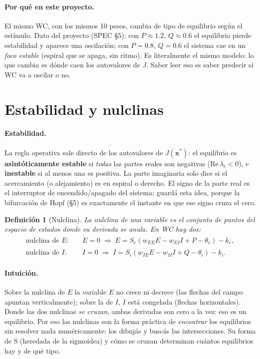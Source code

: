 \documentclass[11pt,a4paper]{article}
\newtheorem{definition}{Definición}
\begin{document}
\paragraph{Por qué en este proyecto.} El mismo WC, con los mismos 10 pesos, cambia de tipo de equilibrio según el estímulo. Dato del proyecto (SPEC \S5): con $P\!\approx\!1.2,\,Q\!\approx\!0.6$ el equilibrio pierde estabilidad y aparece una oscilación; con $P\!=\!0.8,\,Q\!=\!0.6$ el sistema cae en un \emph{foco estable} (espiral que se apaga, sin ritmo). Es literalmente el mismo modelo: lo que cambia es dónde caen los autovalores de $J$. Saber leer eso es saber predecir si WC va a oscilar o no.

\section{Estabilidad y nulclinas}

\paragraph{Estabilidad.} La regla operativa sale directo de los autovalores de $J(\mathbf{x}^{*})$: el equilibrio es \textbf{asintóticamente estable} si \emph{todas} las partes reales son negativas ($\mathrm{Re}\,\lambda_i<0$), e \textbf{inestable} si al menos una es positiva. La parte imaginaria solo dice si el acercamiento (o alejamiento) es en espiral o derecho. El signo de la parte real es el interruptor de encendido/apagado del sistema; guardá esta idea, porque la bifurcación de Hopf (\S5) es exactamente el instante en que ese signo cruza el cero.

\begin{definition}[Nulclina]
La \emph{nulclina} de una variable es el conjunto de puntos del espacio de estados donde su derivada se anula. En WC hay dos:
\begin{align*}
\text{nulclina de } E:&\quad \dot E = 0 \;\Longrightarrow\; E = S_e(w_{EE}E - w_{EI}I + P - \theta_e) - k_e,\\
\text{nulclina de } I:&\quad \dot I = 0 \;\Longrightarrow\; I = S_i(w_{IE}E - w_{II}I + Q - \theta_i) - k_i.
\end{align*}
\end{definition}

\paragraph{Intuición.} Sobre la nulclina de $E$ la variable $E$ no crece ni decrece (las flechas del campo apuntan verticalmente); sobre la de $I$, $I$ está congelada (flechas horizontales). Donde las dos nulclinas \emph{se cruzan}, ambas derivadas son cero a la vez: eso es un equilibrio. Por eso las nulclinas son la forma práctica de \emph{encontrar} los equilibrios sin resolver nada numéricamente: los dibujás y buscás las intersecciones. Su forma de S (heredada de la sigmoidea) y cómo se cruzan determinan cuántos equilibrios hay y de qué tipo.
\end{document}
